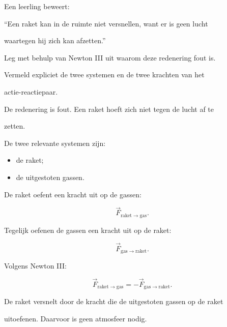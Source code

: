 \documentclass{ximera}
\begin{document}
\begin{oefening}{\oefU\ESS}

Een leerling beweert:

\begin{center} ``Een raket kan in de ruimte niet versnellen, want er is geen lucht

waartegen hij zich kan afzetten.''

\end{center}

Leg met behulp van Newton III uit waarom deze redenering fout is.

Vermeld expliciet de twee systemen en de twee krachten van het

actie-reactiepaar.


\begin{oplossing}

De redenering is fout. Een raket hoeft zich niet tegen de lucht af te

zetten.

De twee relevante systemen zijn:

\begin{itemize}

  \item de raket;

  \item de uitgestoten gassen.

\end{itemize}

De raket oefent een kracht uit op de gassen:

\[\vec F_{\mathrm{raket}\rightarrow\mathrm{gas}}.\]

Tegelijk oefenen de gassen een kracht uit op de raket:

\[\vec F_{\mathrm{gas}\rightarrow\mathrm{raket}}.\]

Volgens Newton III:

\[\boxed{ \vec F_{\mathrm{raket}\rightarrow\mathrm{gas}} = -\vec F_{\mathrm{gas}\rightarrow\mathrm{raket}} }.\]

De raket versnelt door de kracht die de uitgestoten gassen op de raket

uitoefenen. Daarvoor is geen atmosfeer nodig.

\end{oplossing}

\end{oefening}


\end{document}
